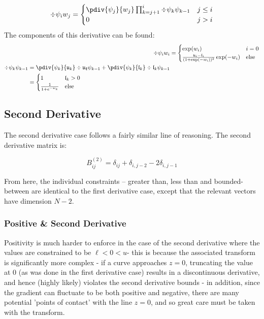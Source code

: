 \documentclass[]{article}
\begin{document}
					\begin{equation}
						\div{\psi_i}{w_j} = \begin{cases} 
						\pdiv{\psi_j}{w_j} \prod_{k = j+1}^i \div{\psi_k}{\psi_{k-1}} & j \leq i
						\\
						0 & j > i
					 \end{cases}
					\end{equation}
					The components of this derivative can be found:
					\begin{align}
						\div{\psi_i}{w_i} &= \begin{cases} \exp(w_i) & i = 0 
							\\
							\frac{\mathfrak{u}_i - \mathfrak{l}_i}{(1 + \exp(-w_i))^2} \exp(-w_i) & \text{else}\end{cases}
							\\
							\begin{split}
							\div{\psi_{k}}{\psi_{k-1}} & = \pdiv{\psi_k}{\mathfrak{u}_k} \div{\mathfrak{u_k}}{\psi_{k-1}} + \pdiv{\psi_k}{\mathfrak{l}_k} \div{\mathfrak{l}_k}{\psi_{k-1}}
							\\
							& = \begin{cases}
								1 & \mathfrak{l}_k > 0
								\\
								\frac{1}{1 + e^{-w_{k}}} & \text{else}
							\end{cases}
							\end{split}
					\end{align}
		\subsection{Second Derivative}

			The second derivative case follows a fairly similar line of reasoning. The second derivative matrix is:
			
			\begin{equation}
				B^{(2)}_{ij} = \delta_{ij} + \delta_{i,j-2} - 2 \delta_{i,j-1}
			\end{equation}

			From here, the individual constraints -- greater than, less than and bounded-between are identical to the first derivative case, except that the relevant vectors have dimension $N-2$.

			\subsubsection{Positive \& Second Derivative}

				Positivity is much harder to enforce in the case of the second derivative where the values are constrained to be $\ell < 0 < u$- this is because the associated transform is significantly more complex - if a curve approaches $z = 0$, truncating the value at 0 (as was done in the first derivative case) results in a discontinuous derivative, and hence (highly likely) violates the second derivative bounds - in addition, since the gradient can fluctuate to be both positive and negative, there are many potential 'points of contact' with the line $z = 0$, and so great care must be taken with the transform. 
				
\end{document}
